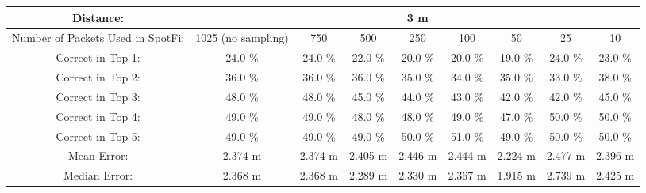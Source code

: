 \begin{tabular}{| c || c | c | c | c | c | c | c | c |}
\hline
Distance: &  &  &  & 3 m  &  &  &  &  \\
\hline
Number of Packets Used in SpotFi: & 1025 (no sampling) & 750 & 500 & 250 & 100 & 50 & 25 & 10 \\
\hline
\hline
Correct in Top 1: & 24.0 \% & 24.0 \% & 22.0 \% & 20.0 \% & 20.0 \% & 19.0 \% & 24.0 \% & 23.0 \% \\
\hline
Correct in Top 2: & 36.0 \% & 36.0 \% & 36.0 \% & 35.0 \% & 34.0 \% & 35.0 \% & 33.0 \% & 38.0 \% \\
\hline
Correct in Top 3: & 48.0 \% & 48.0 \% & 45.0 \% & 44.0 \% & 43.0 \% & 42.0 \% & 42.0 \% & 45.0 \% \\
\hline
Correct in Top 4: & 49.0 \% & 49.0 \% & 48.0 \% & 48.0 \% & 49.0 \% & 47.0 \% & 50.0 \% & 50.0 \% \\
\hline
Correct in Top 5: & 49.0 \% & 49.0 \% & 49.0 \% & 50.0 \% & 51.0 \% & 49.0 \% & 50.0 \% & 50.0 \% \\
\hline
\hline
Mean Error: & 2.374 m & 2.374 m & 2.405 m & 2.446 m & 2.444 m & 2.224 m & 2.477 m & 2.396 m \\
\hline
Median Error: & 2.368 m & 2.368 m & 2.289 m & 2.330 m & 2.367 m & 1.915 m & 2.739 m & 2.425 m \\
\hline
\end{tabular}
